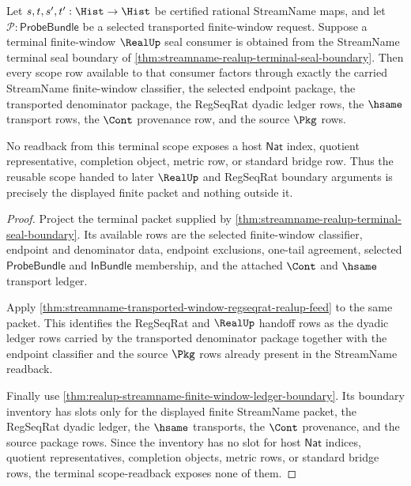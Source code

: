 \begin{theorem}
\label{thm:streamname-realup-terminal-seal-scope-readback}
Let $s,t,s',t':\Hist\to\Hist$ be certified rational StreamName maps, and let
$\mathcal P:\mathsf{ProbeBundle}$ be a selected transported finite-window
request. Suppose a terminal finite-window $\RealUp$ seal consumer is obtained
from the StreamName terminal seal boundary of
\autoref{thm:streamname-realup-terminal-seal-boundary}. Then every scope row
available to that consumer factors through exactly the carried StreamName
finite-window classifier, the selected endpoint package, the transported
denominator package, the RegSeqRat dyadic ledger rows, the $\hsame$ transport
rows, the $\Cont$ provenance row, and the source $\Pkg$ rows.

No readback from this terminal scope exposes a host $\mathsf{Nat}$ index,
quotient representative, completion object, metric row, or standard bridge
row. Thus the reusable scope handed to later $\RealUp$ and RegSeqRat boundary
arguments is precisely the displayed finite packet and nothing outside it.
\end{theorem}
\begin{proof}
Project the terminal packet supplied by
\autoref{thm:streamname-realup-terminal-seal-boundary}. Its available rows are
the selected finite-window classifier, endpoint and denominator data,
endpoint exclusions, one-tail agreement, selected $\mathsf{ProbeBundle}$ and
$\mathsf{InBundle}$ membership, and the attached $\Cont$ and $\hsame$ transport
ledger.

Apply \autoref{thm:streamname-transported-window-regseqrat-realup-feed} to the
same packet. This identifies the RegSeqRat and $\RealUp$ handoff rows as the
dyadic ledger rows carried by the transported denominator package together
with the endpoint classifier and the source $\Pkg$ rows already present in the
StreamName readback.

Finally use \autoref{thm:realup-streamname-finite-window-ledger-boundary}. Its
boundary inventory has slots only for the displayed finite StreamName packet,
the RegSeqRat dyadic ledger, the $\hsame$ transports, the $\Cont$ provenance,
and the source package rows. Since the inventory has no slot for host
$\mathsf{Nat}$ indices, quotient representatives, completion objects, metric
rows, or standard bridge rows, the terminal scope-readback exposes none of
them.
\end{proof}
